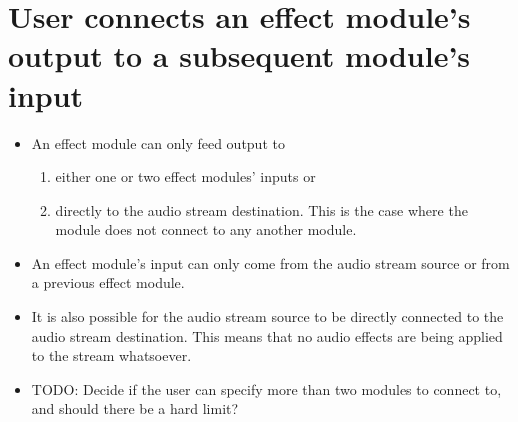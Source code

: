 \section{User connects an effect module's output to a subsequent module's input}


\begin{itemize}
	\item An effect module can only feed output to
	\begin{enumerate}
		\item either one or two effect modules' inputs or
		\item directly to the audio stream destination. This is the case where the module does not connect to any another module.
	\end{enumerate}
	
	\item An effect module's input can only come from the audio stream source or from a previous effect module.

	\item It is also possible for the audio stream source to be directly connected to the audio stream destination. This means that no audio effects are being applied to the stream whatsoever. 

	\item TODO: Decide if the user can specify more than two modules to connect to, and should there be a hard limit?
	


\end{itemize}